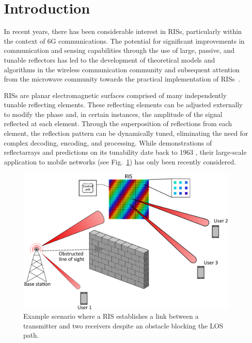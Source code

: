 \section{Introduction}
\label{sc:introduction}


In recent years, there has been considerable interest in \glspl{RIS}, particularly within the context of 6G communications.  The potential for significant improvements in communication and sensing capabilities through the use of large, passive, and tunable reflectors has led to the development of theoretical models and algorithms in the wireless communication community \cite{di2020smart,yu2021smart} and subsequent attention from the microwave community towards the practical implementation of \glspl{RIS}~\cite{kazim2020wireless}.

\glspl{RIS} are planar electromagnetic surfaces comprised of many independently tunable reflecting elements. 
These reflecting elements can be adjusted externally to modify the phase and, in certain instances, the amplitude of the signal reflected at each element. %
Through the superposition of reflections from each element, the reflection pattern can be dynamically tuned, eliminating the need for complex decoding, encoding, and processing. 
While demonstrations of reflectarrays and predictions on its tunability date back to 1963 \cite{berry1963reflectarray}, their large-scale application to mobile networks (see Fig.~\ref{fig:RISScenario}) has only been recently considered.

\begin{figure}[t]
	\centering
	\includegraphics[width=0.96\columnwidth]{Figures/Motivation.png}
	\caption{Example scenario where a \gls{RIS} establishes a link between a transmitter and two receivers despite an obstacle blocking the \gls{LOS} path.}
	\label{fig:RISScenario}
\end{figure}

